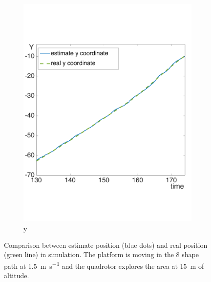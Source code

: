 \begin{figure}[!htbp]
\begin{subfigure}[b]{0.35\textwidth}
        \includegraphics[width=\textwidth]{img/high_altitude_error_y.pdf}
        \caption{y}
        \label{fig:two}
   \end{subfigure}
  \caption{Comparison between estimate position (blue dots) and real position (green line) in simulation. The platform is moving in the 8 shape path at \SI{1.5}{\meter \per \second} and the quadrotor explores the area at \SI{15}{\meter} of altitude.}
  \label{fig:ekf_high_altitude_comparison}
\end{figure} 

